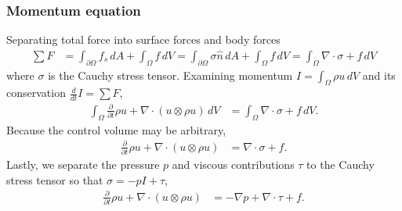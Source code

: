 \documentclass[letterpaper,11pt,nointlimits,reqno,draft]{amsart}
\begin{document}
\subsubsection{Momentum equation}
Separating total force into surface forces and body forces
\begin{align}
  \sum{}F
  &=
     \int_{\partial\Omega} f_s \, dA
   + \int_{\Omega} f \, dV
  =
     \int_{\partial\Omega} \sigma \hat{n} \, dA
  +  \int_{\Omega} f \, dV
  =  \int_{\Omega} \nabla\cdot\sigma + f \, dV
\end{align}
where $\sigma$ is the Cauchy stress tensor.  Examining
momentum $I=\int_{\Omega} \rho{}u\,dV$ and its conservation
$\frac{d}{dt}I=\sum{}F$,
\begin{align}
    \int_{\Omega}\frac{\partial{}}{\partial{}t}\rho{}u
  + \nabla\cdot(u\otimes{}\rho{}u)\,dV
&= \int_{\Omega} \nabla\cdot\sigma + f \, dV
.
\end{align}
Because the control volume may be arbitrary,
\begin{align}
  \frac{\partial{}}{\partial{}t}\rho{}u + \nabla\cdot(u\otimes{}\rho{}u)
&= \nabla\cdot\sigma + f
.
\end{align}
Lastly, we separate the pressure $p$ and viscous contributions $\tau$ to
the Cauchy stress tensor so that $\sigma = -p I + \tau$,
\begin{align}
\label{eq:cons_momentum}
\frac{\partial{}}{\partial{}t}\rho{}u + \nabla\cdot(u\otimes{}\rho{}u)
&= -\nabla{}p + \nabla\cdot{}\tau + f
.
\end{align}
\end{document}
